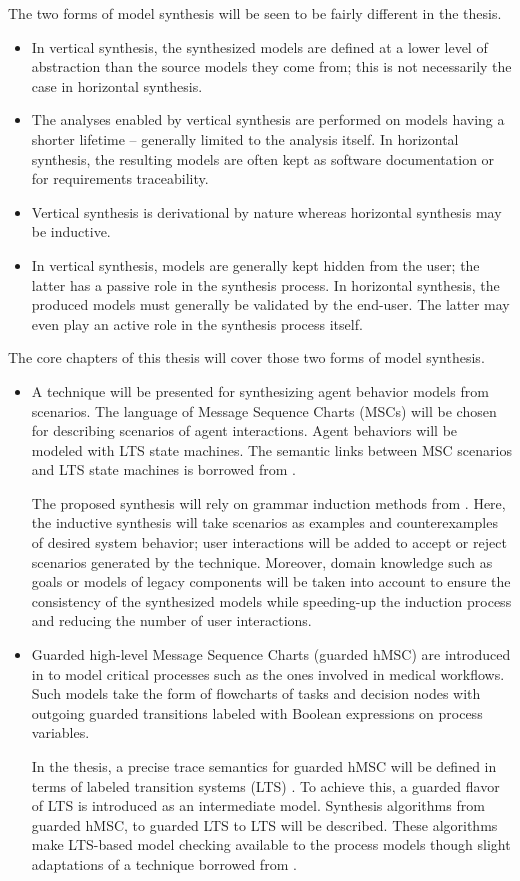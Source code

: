 The two forms of model synthesis will be seen to be fairly different in the thesis.
\begin{itemize}
\item In vertical synthesis, the synthesized models are defined at a lower level of abstraction than the source models they come from; this is not necessarily the case in horizontal synthesis.
\item The analyses enabled by vertical synthesis are performed on models having a shorter lifetime -- generally limited to the analysis itself. In horizontal synthesis, the resulting models are often kept as software documentation or for requirements traceability. 
\item Vertical synthesis is derivational by nature whereas horizontal synthesis may be inductive.
\item In vertical synthesis, models are generally kept hidden from the user; the latter has a passive role in the synthesis process. In horizontal synthesis, the produced models must generally be validated by the end-user. The latter may even play an active role in the synthesis process itself.
\end{itemize}

The core chapters of this thesis will cover those two forms of model synthesis.
\begin{itemize}
\item A technique will be presented for synthesizing agent behavior models from scenarios. The language of Message Sequence Charts (MSCs) will be chosen for describing scenarios of agent interactions. Agent behaviors will be modeled with LTS state machines. The semantic links between MSC scenarios and LTS state machines is borrowed from \cite{Uchitel:2003}.

The proposed synthesis will rely on grammar induction methods from \cite{Oncina:1992, Lang:1998}. Here, the inductive synthesis will take scenarios as examples and counterexamples of desired system behavior; user interactions will be added to accept or reject scenarios generated by the technique. Moreover, domain knowledge such as goals or models of legacy components will be taken into account to ensure the consistency of the synthesized models while speeding-up the induction process and reducing the number of user interactions.

\item Guarded high-level Message Sequence Charts (guarded hMSC) are introduced in \cite{Damas:2010, Damas:2011} to model critical processes such as the ones involved in medical workflows. Such models take the form of flowcharts of tasks and decision nodes with outgoing guarded transitions labeled with Boolean expressions on process variables. 

In the thesis, a precise trace semantics for guarded hMSC will be defined in terms of labeled transition systems (LTS) \cite{Keller:1976, Magee:1999}. To achieve this, a guarded flavor of LTS is introduced as an intermediate model. Synthesis algorithms from guarded hMSC, to guarded LTS to LTS will be described. These algorithms make LTS-based model checking available to the process models though slight adaptations of a technique borrowed from \cite{Giannakopoulou:2003}.
\end{itemize}
